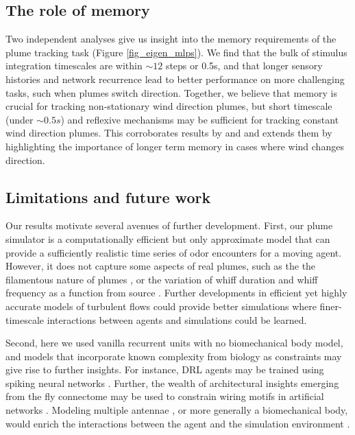\documentclass[5p,twocolumn,authoryear]{elsarticle}
\begin{document}
\subsection*{The role of memory}
Two independent analyses give us insight into the memory requirements of the plume tracking task (Figure \ref{fig_eigen_mlps}).
We find that the bulk of stimulus integration timescales are within $\sim12$ steps or 0.5s, and that longer sensory histories and network recurrence lead to better performance on more challenging tasks, such when plumes switch direction.
Together, we believe that memory is crucial for tracking non-stationary wind direction plumes, but short timescale (under $\sim0.5s$) and reflexive mechanisms may be sufficient for tracking constant wind direction plumes.
This corroborates results by \cite{pang2018history} and \cite{grunbaum2015spatial} and extends them by highlighting the importance of longer term memory in cases where wind changes direction. 
\\

\subsection*{Limitations and future work}
Our results motivate several avenues of further development.
First, our plume simulator is a computationally efficient but only approximate model that can provide a sufficiently realistic time series of odor encounters for a moving agent.
However, it does not capture some aspects of real plumes, such as the the filamentous nature of plumes \citep{celani2014odor}, or the variation of whiff duration and whiff frequency as a function from source \citep{villermaux1999geometry}.
Further developments in efficient yet highly accurate models of turbulent flows \citep{stachenfeld2021learned} could provide better simulations where finer-timescale interactions between agents and simulations could be learned.

Second, here we used vanilla recurrent units with no biomechanical body model, and models that incorporate known complexity from biology as constraints may give rise to further insights.
For instance, DRL agents may be trained using spiking neural networks \citep{Adden2020,yuan2019reinforcement,recanatesi2019dimensionality}.
Further, the wealth of architectural insights emerging from the fly connectome may be used to constrain wiring motifs in artificial networks \citep{hulse2020connectome,scheffer2020connectome}.
Modeling multiple antennae \citep{Kadakia2021,reddy2021sector}, or more generally a biomechanical body, would enrich the interactions between the agent and the simulation environment \citep{rios2021neuromechfly,plum2021scant,merel2019deep}.
\end{document}
